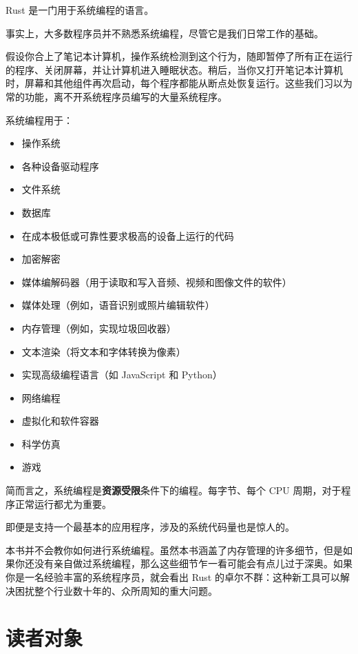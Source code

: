 
Rust 是一门用于系统编程的语言。

事实上，大多数程序员并不熟悉系统编程，尽管它是我们日常工作的基础。

假设你合上了笔记本计算机，操作系统检测到这个行为，随即暂停了所有正在运行的程序、关闭屏幕，并让计算机进入睡眠状态。稍后，当你又打开笔记本计算机时，屏幕和其他组件再次启动，每个程序都能从断点处恢复运行。这些我们习以为常的功能，离不开系统程序员编写的大量系统程序。

系统编程用于：

\begin{itemize}
\item 操作系统
\item 各种设备驱动程序
\item 文件系统
\item 数据库
\item 在成本极低或可靠性要求极高的设备上运行的代码
\item 加密解密
\item 媒体编解码器（用于读取和写入音频、视频和图像文件的软件）
\item 媒体处理（例如，语音识别或照片编辑软件）
\item 内存管理（例如，实现垃圾回收器）
\item 文本渲染（将文本和字体转换为像素）
\item 实现高级编程语言（如 JavaScript 和 Python）
\item 网络编程
\item 虚拟化和软件容器
\item 科学仿真
\item 游戏
\end{itemize}

简而言之，系统编程是\textbf{资源受限}条件下的编程。每字节、每个 CPU 周期，对于程序正常运行都尤为重要。

即便是支持一个最基本的应用程序，涉及的系统代码量也是惊人的。

本书并不会教你如何进行系统编程。虽然本书涵盖了内存管理的许多细节，但是如果你还没有亲自做过系统编程，那么这些细节乍一看可能会有点儿过于深奥。如果你是一名经验丰富的系统程序员，就会看出 Rust 的卓尔不群：这种新工具可以解决困扰整个行业数十年的、众所周知的重大问题。

\section{读者对象}

